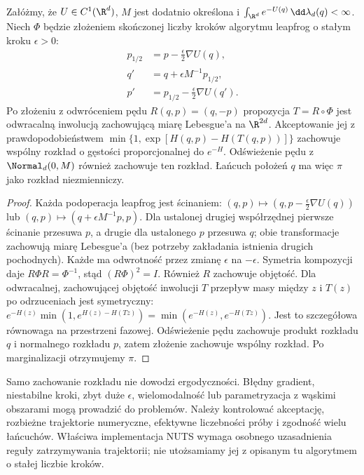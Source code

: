 \begin{stwierdzenie}
\label{prop:hmc-step}
Załóżmy, że $U\in C^1(\R^d)$, $M$ jest dodatnio
określona i $\int_{\R^d}e^{-U(q)}\,\dd\lambda_d(q)<\infty$.
Niech $\Phi$ będzie złożeniem skończonej liczby
kroków algorytmu leapfrog o stałym kroku $\epsilon>0$:
\[
 \begin{aligned}
 p_{1/2}&=p-\tfrac\epsilon2\nabla U(q),\\
 q'&=q+\epsilon M^{-1}p_{1/2},\\
 p'&=p_{1/2}-\tfrac\epsilon2\nabla U(q').
 \end{aligned}
\]
Po złożeniu z odwróceniem pędu $R(q,p)=(q,-p)$
propozycja $T=R\circ\Phi$ jest odwracalną inwolucją
zachowującą miarę Lebesgue'a na $\R^{2d}$.
Akceptowanie jej z prawdopodobieństwem
$\min\{1,\exp[H(q,p)-H(T(q,p))]\}$ zachowuje
wspólny rozkład o gęstości proporcjonalnej do $e^{-H}$.
Odświeżenie pędu z $\Normal_d(0,M)$ również zachowuje
ten rozkład. Łańcuch położeń $q$ ma więc $\pi$
jako rozkład niezmienniczy.
\end{stwierdzenie}
\begin{proof}
Każda podoperacja leapfrog jest ścinaniem:
$(q,p)\mapsto(q,p-\frac\epsilon2\nabla U(q))$
lub $(q,p)\mapsto(q+\epsilon M^{-1}p,p)$.
Dla ustalonej drugiej współrzędnej pierwsze ścinanie
przesuwa $p$, a drugie dla ustalonego $p$ przesuwa $q$;
obie transformacje zachowują miarę Lebesgue'a
(bez potrzeby zakładania istnienia drugich pochodnych).
Każde ma odwrotność przez zmianę $\epsilon$ na $-\epsilon$.
Symetria kompozycji daje $R\Phi R=\Phi^{-1}$,
stąd $(R\Phi)^2=I$. Również $R$ zachowuje objętość.
Dla odwracalnej, zachowującej objętość inwolucji $T$
przepływ masy między $z$ i $T(z)$ po odrzuceniach
jest symetryczny:
$e^{-H(z)}\min(1,e^{H(z)-H(Tz)})
=\min(e^{-H(z)},e^{-H(Tz)})$.
Jest to szczegółowa równowaga na przestrzeni fazowej.
Odświeżenie pędu zachowuje produkt rozkładu $q$ i
normalnego rozkładu $p$, zatem złożenie zachowuje
wspólny rozkład. Po marginalizacji otrzymujemy $\pi$.
\end{proof}

\begin{uwaga}
Samo zachowanie rozkładu nie dowodzi ergodyczności.
Błędny gradient, niestabilne kroki, zbyt duże $\epsilon$,
wielomodalność lub parametryzacja z wąskimi obszarami
mogą prowadzić do problemów. Należy kontrolować
akceptację, rozbieżne trajektorie numeryczne, efektywne
liczebności próby i zgodność wielu łańcuchów.
Właściwa implementacja NUTS wymaga osobnego uzasadnienia
reguły zatrzymywania trajektorii; nie utożsamiamy jej
z opisanym tu algorytmem o stałej liczbie kroków.
\end{uwaga}

